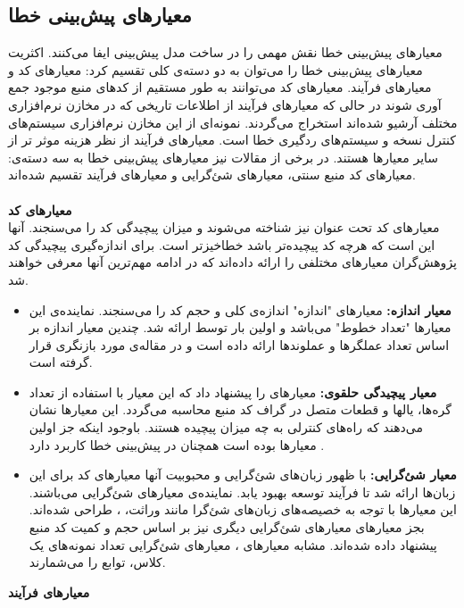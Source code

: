 \subsection{معیارهای پیش‌بینی خطا}

معیارهای پیش‌بینی خطا نقش مهمی را در ساخت مدل پیش‌بینی ایفا می‌کنند. اکثریت معیارهای پیش‌بینی خطا را می‌توان به دو دسته‌ی  کلی تقسیم کرد: معیارهای کد و معیارهای فرآیند. معیارهای کد می‌توانند به طور مستقیم از کدهای منبع موجود جمع آوری شوند در حالی که معیارهای فرآیند  از اطلاعات تاریخی که در مخازن نرم‌افزاری مختلف آرشیو شده‌اند استخراج می‌گردند. نمونه‌ای از این مخازن نرم‌افزاری سیستم‌های کنترل نسخه و سیستم‌های ردگیری خطا است. معیار‌های فرآیند از نظر هزینه موثر تر از سایر معیارها هستند\cite{arisholm2010systematic}. در برخی از مقالات نیز معیارهای  پیش‌بینی خطا به سه دسته‌ی: معیارهای کد منبع سنتی، معیارهای شئ‌گرایی و معیارهای فرآیند تقسیم شده‌اند\cite{radjenovic2013software}.\\\\
\textbf{معیارهای کد} \\

معیارهای کد تحت عنوان  نیز شناخته می‌شوند و میزان پیچیدگی کد را می‌سنجند.  آنها این است که هرچه کد پیچیده‌تر باشد خطا‌خیز‌تر است. برای اندازه‌گیری پیچیدگی کد پژوهش‌گران معیار‌های مختلفی را ارائه داده‌اند که در ادامه   مهم‌ترین آنها معرفی خواهند شد. 
\begin{itemize}
	\item \textbf{معیار اندازه: }
معیارهای "اندازه" اندازه‌ی کلی و حجم کد را می‌سنجند. نماینده‌ی این معیارها "تعداد خطوط" می‌باشد و اولین بار توسط 
 \cite{akiyama1971example}  
 ارائه شد. 
 \cite{halstead1977elements} 
 چندین معیار اندازه بر اساس  تعداد عملگرها و عملوند‌ها ارائه داده است و در مقاله‌ی \cite{pawade2016exploring} مورد بازنگری قرار گرفته است.
\item \textbf{معیار پیچیدگی حلقوی: }
 معیارهای 
را پیشنهاد داد که این معیار با استفاده از تعداد گره‌ها، یالها و قطعات متصل در گراف   کد منبع محاسبه می‌گردد\cite{mccabe1976complexity}. این معیارها نشان می‌دهند که راه‌های کنترلی به چه میزان پیچیده هستند. باوجود اینکه جز اولین معیارها بوده است همچنان در پیش‌بینی خطا کاربرد دارد \cite{malhotra2014comparative}.
\item \textbf{معیار شئ‌گرایی: }
با ظهور زبان‌های شئ‌گرایی و محبوبیت آنها معیارهای کد  برای این زبان‌ها ارائه شد تا فرآیند توسعه بهبود یابد. نماینده‌ی معیارهای شئ‌گرایی 
 می‌باشند\cite{chidamber1994metrics}. این معیارها با توجه به خصیصه‌های زبان‌های شئ‌گرا مانند وراثت، ،  طراحی شده‌اند. بجز معیارهای معیارهای شئ‌گرایی دیگری نیز بر اساس حجم و کمیت کد منبع پیشنهاد داده شده‌اند. مشابه معیارهای ، معیارهای شئ‌گرایی تعداد نمونه‌های یک کلاس، توابع را می‌شمارند. \\
\end{itemize}
\textbf{معیارهای فرآیند} \\

